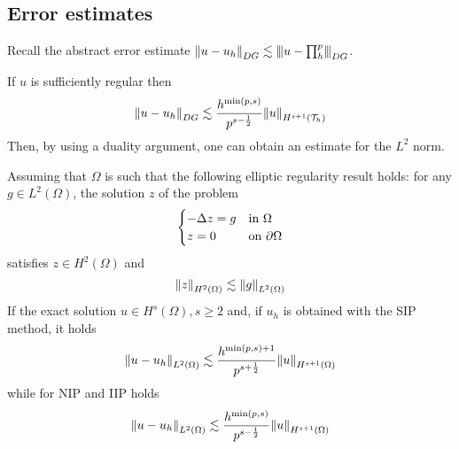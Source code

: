 \subsection{Error estimates}
Recall the abstract error estimate \(\norm{u - u_h}_{DG} \lesssim \threenorm{u-\prod_{h}^{p}}{DG}\).

If \(u\) is sufficiently regular then
\[
    \norm{u-u_h}_{DG} \lesssim \frac{h^{\min(p,s)}}{p^{s-\frac{1}{2}}}\norm{u}_{H^{s+1}(\mathcal{T}_h)}
\]
Then, by using a duality argument, one can obtain an estimate for the \(L^2\) norm.

Assuming that \(\Omega\) is such that the following elliptic regularity result holds: for any \(g \in L^2(\Omega)\), the solution \(z\) of the problem
\[
   \begin{cases}
     -\Delta z = g & \text{in }\Omega \\
     z = 0 & \text{on } \partial\Omega
   \end{cases}
\]
satisfies \(z \in H^2(\Omega)\) and 
\[
    \norm{z}_{H^2(\Omega)} \lesssim \norm{g}_{L^2(\Omega)}
\]
If the exact solution \(u \in H^s(\Omega), s \geq 2\) and, if \(u_h\) is obtained with the SIP method, it holds 
\[
    \norm{u-u_h}_{L^2(\Omega)} \lesssim \frac{h^{\min(p,s)+1}}{p^{s+\frac{1}{2}}}\norm{u}_{H^{s+1}(\Omega)}
\]
while for NIP and IIP holds
\[
    \norm{u-u_h}_{L^2(\Omega)} \lesssim \frac{h^{\min(p,s)}}{p^{s-\frac{1}{2}}}\norm{u}_{H^{s+1}(\Omega)}
\]